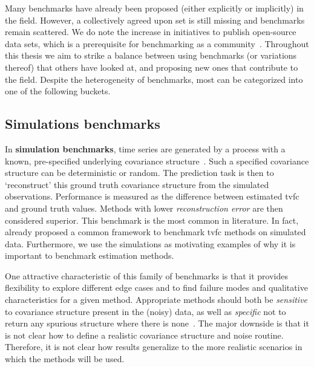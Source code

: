 Many benchmarks have already been proposed (either explicitly or implicitly) in the field.
However, a collectively agreed upon set is still missing and benchmarks remain scattered.
We do note the increase in initiatives to publish open-source data sets, which is a prerequisite for benchmarking as a community~\parencite{Gorgolewski2016, Kennedy2016, Nichols2017, Leenings2022}.
Throughout this thesis we aim to strike a balance between using benchmarks (or variations thereof) that others have looked at, and proposing new ones that contribute to the field.
Despite the heterogeneity of benchmarks, most can be categorized into one of the following buckets.

\subsection{Simulations benchmarks}\label{subsec:simulation-benchmarks}

In \textbf{simulation benchmarks}, time series are generated by a process with a known, pre-specified underlying covariance structure~\parencite[see e.g.][]{Sakoglu2010, Lindquist2014, Hindriks2016, Shakil2016, Lan2017, Monti2017, Taghia2017, Thompson2018, Warnick2018, Li2019b, Ebrahimi2020}.
Such a specified covariance structure can be deterministic or random.
%
The prediction task is then to `reconstruct' this ground truth covariance structure from the simulated observations.
Performance is measured as the difference between estimated \gls{tvfc} and ground truth values.
Methods with lower \emph{reconstruction error} are then considered superior.
%
This benchmark is the most common in literature.
In fact, \textcite{Thompson2018} already proposed a common framework to benchmark \gls{tvfc} methods on simulated data.
%
Furthermore, we use the simulations as motivating examples of why it is important to benchmark estimation methods.

One attractive characteristic of this family of benchmarks is that it provides flexibility to explore different edge cases and to find failure modes and qualitative characteristics for a given method.
Appropriate methods should both be \emph{sensitive} to covariance structure present in the (noisy) data, as well as \emph{specific} not to return any spurious structure where there is none~\parencite{Leonardi2015}.
%
The major downside is that it is not clear how to define a realistic covariance structure and noise routine.
Therefore, it is not clear how results generalize to the more realistic scenarios in which the methods will be used.

